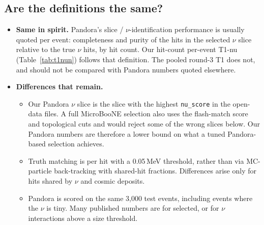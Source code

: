 \documentclass[11pt,a4paper]{article}
\newcommand{\code}[1]{\texttt{\small #1}}
\begin{document}
\subsection{Are the definitions the same?}
\begin{itemize}
  \item \textbf{Same in spirit.} Pandora's slice / $\nu$-identification performance is usually quoted per event: completeness and purity of the hits in the selected $\nu$ slice relative to the true $\nu$ hits, by hit count. Our hit-count per-event T1-nu (Table~\ref{tab:t1nun}) follows that definition. The pooled round-3 T1 does not, and should not be compared with Pandora numbers quoted elsewhere.
  \item \textbf{Differences that remain.}
  \begin{itemize}
    \item Our Pandora $\nu$ slice is the slice with the highest \code{nu\_score} in the open-data files. A full MicroBooNE selection also uses the flash-match score and topological cuts and would reject some of the wrong slices below. Our Pandora numbers are therefore a lower bound on what a tuned Pandora-based selection achieves.
    \item Truth matching is per hit with a 0.05\,MeV threshold, rather than via MC-particle back-tracking with shared-hit fractions. Differences arise only for hits shared by $\nu$ and cosmic deposits.
    \item Pandora is scored on the same 3{,}000 test events, including events where the $\nu$ is tiny. Many published numbers are for selected, or for $\nu$ interactions above a size threshold.
  \end{itemize}
\end{itemize}
\end{document}
